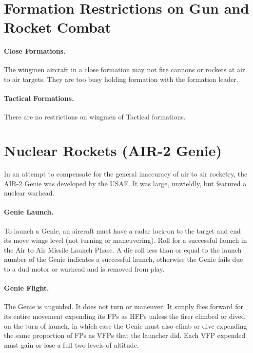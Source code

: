 \begin{advancedrules}
\section{Formation Restrictions on Gun and Rocket Combat}

\paragraph{Close Formations.} The wingmen aircraft in a close formation may not fire cannons or rockets at air to air targets. They are too busy holding formation with the formation leader.

\paragraph{Tactical Formations.} There are no restrictions on wingmen of Tactical formations.


\section{Nuclear Rockets (AIR-2 Genie)}
\label{rule:air-to-air-nuclear-rockets}
\label{rule:genie}


In an attempt to compensate for the general inaccuracy of air to air rocketry, the AIR-2 Genie was developed by the USAF. It was large, unwieldly, but featured a nuclear warhead.

\paragraph{Genie Launch.} To launch a Genie, an aircraft must have a radar lock-on to the target and end its move wings level (not turning or maneuvering). Roll for a successful launch in the Air to Air Missile Launch Phase. A die roll less than or equal to the launch number of the Genie indicates a successful launch, otherwise the Genie fails due to a dud motor or warhead and is removed from play.

\paragraph{Genie Flight.} The Genie is unguided. It does not turn or maneuver. It simply flies forward for its entire movement expending its FPs as HFPs unless the firer climbed or dived on the turn of launch, in which case the Genie must also climb or dive expending the same proportion of FPs as VFPs that the launcher did. Each VFP expended must gain or lose a full two levels of altitude.


\end{advancedrules}
